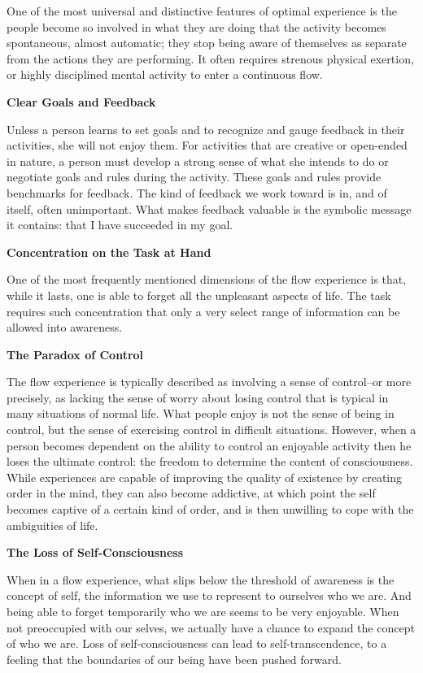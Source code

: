 One of the most universal and distinctive features of optimal experience is the people become so involved in what they are doing that the activity becomes spontaneous, almost automatic; they stop being aware of themselves as separate from the actions they are performing. It often requires strenous physical exertion, or highly disciplined mental activity to enter a continuous flow.

\textbf{Clear Goals and Feedback}

Unless a person learns to set goals and to recognize and gauge feedback in their activities, she will not enjoy them. For activities that are creative or open-ended in nature, a person must develop a strong sense of what she intends to do or negotiate goals and rules during the activity. These goals and rules provide benchmarks for feedback. The kind of feedback we work toward is in, and of itself, often unimportant. What makes feedback valuable is the symbolic message it contains: that I have succeeded in my goal.

\textbf{Concentration on the Task at Hand}

One of the most frequently mentioned dimensions of the flow experience is that, while it lasts, one is able to forget all the unpleasant aspects of life. The task requires such concentration that only a very select range of information can be allowed into awareness.

\textbf{The Paradox of Control}

The flow experience is typically described as involving a sense of control--or more precisely, as lacking the sense of worry about losing control that is typical in many situations of normal life. What people enjoy is not the sense of being in control, but the sense of exercising control in difficult situations. However, when a person becomes dependent on the ability to control an enjoyable activity then he loses the ultimate control: the freedom to determine the content of consciousness. While experiences are capable of improving the quality of existence by creating order in the mind, they can also become addictive, at which point the self becomes captive of a certain kind of order, and is then unwilling to cope with the ambiguities of life.

\textbf{The Loss of Self-Consciousness}

When in a flow experience, what slips below the threshold of awareness is the concept of self, the information we use to represent to ourselves who we are. And being able to forget temporarily who we are seems to be very enjoyable. When not preoccupied with our selves, we actually have a chance to expand the concept of who we are. Loss of self-consciousness can lead to self-transcendence, to a feeling that the boundaries of our being have been pushed forward.

